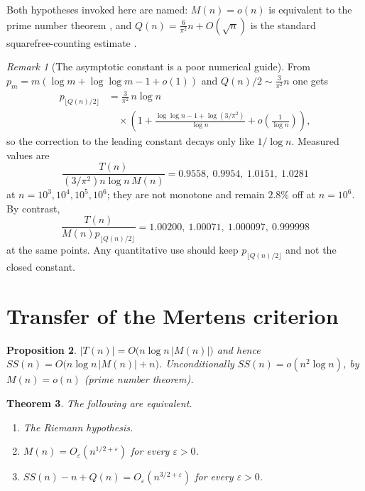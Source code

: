 \documentclass[11pt]{amsart}
\numberwithin{equation}{section}
\theoremstyle{plain}
\newtheorem{theorem}{Theorem}[section]
\newtheorem{proposition}[theorem]{Proposition}
\theoremstyle{definition}
\theoremstyle{remark}
\newtheorem{remark}[theorem]{Remark}
\newcommand{\Mert}{M}
\newcommand{\Sq}{Q}
\begin{document}
Both hypotheses invoked here are named: $\Mert(n)=o(n)$ is equivalent to the prime number theorem
\cite{Titchmarsh1986}, and $\Sq(n)=\tfrac6{\pi^2}n+O(\sqrt n)$ is the standard
squarefree-counting estimate \cite{Apostol1976}.

\begin{remark}[The asymptotic constant is a poor numerical guide]
\label{rem:prime-scale-data}
From $p_m=m(\log m+\log\log m-1+o(1))$ and $\Sq(n)/2\sim \tfrac3{\pi^2}n$ one
gets
\begin{equation}
\label{eq:prime-scale-expansion}
\begin{aligned}
p_{\lfloor \Sq(n)/2\rfloor}
&=\frac{3}{\pi^2}\,n\log n\\
&\quad\times\left(1+\frac{\log\log n-1+\log(3/\pi^2)}{\log n}
+o\!\left(\tfrac1{\log n}\right)\right),
\end{aligned}
\end{equation}
so the correction to the leading constant decays only like $1/\log n$. Measured
values are
\begin{equation}
\label{eq:leading-scale-data}
\frac{T(n)}{(3/\pi^2)n\log n\,\Mert(n)}
=0.9558,\ 0.9954,\ 1.0151,\ 1.0281
\end{equation}
at $n=10^3,10^4,10^5,10^6$; they are not monotone and remain $2.8\%$ off at
$n=10^6$. By contrast,
\begin{equation}
\label{eq:exact-prime-scale-data}
\frac{T(n)}{\Mert(n)p_{\lfloor \Sq(n)/2\rfloor}}
=1.00200,\ 1.00071,\ 1.000097,\ 0.999998
\end{equation}
at the same points. Any quantitative use should keep
$p_{\lfloor \Sq(n)/2\rfloor}$ and not the closed constant.
\end{remark}

\section{Transfer of the Mertens criterion}
\label{sec:mertens-transfer}

\begin{proposition}
\label{prop:growth}
$|T(n)|=O\bigl(n\log n\,|\Mert(n)|\bigr)$ and hence
$SS(n)=O\bigl(n\log n\,|\Mert(n)|+n\bigr)$. Unconditionally
$SS(n)=o(n^2\log n)$, by $\Mert(n)=o(n)$ (prime number theorem).
\end{proposition}

\begin{theorem}\label{thm:RH}
The following are equivalent.
\begin{enumerate}[label=(\alph*)]
\item The Riemann hypothesis.
\item $\Mert(n)=O_\varepsilon(n^{1/2+\varepsilon})$ for every $\varepsilon>0$.
\item $SS(n)-n+\Sq(n)=O_\varepsilon(n^{3/2+\varepsilon})$ for every
$\varepsilon>0$.
\end{enumerate}
\end{theorem}
\end{document}
